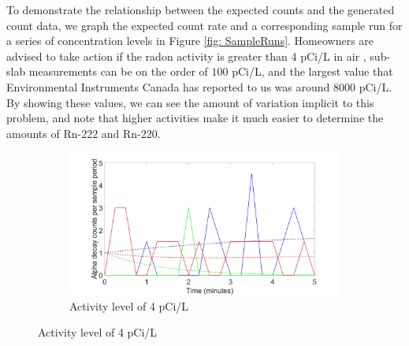 \documentclass[11pt]{m2pi}
\begin{document}
To demonstrate the relationship between the expected counts and the generated count data, we graph the expected count rate and a corresponding sample run for a series of concentration levels in Figure \ref{fig: SampleRuns}. Homeowners are advised to take action if the radon activity is greater than 4 pCi/L in air \cite{EPA}, sub-slab measurements can be on the order of $100$ pCi/L, and the largest value that Environmental Instruments Canada has reported to us was around $8000$ pCi/L. By showing these values, we can see the amount of variation implicit to this problem, and note that higher activities make it much easier to determine the amounts of Rn-222 and Rn-220.
\begin{figure}[h]
        \centering
        \begin{subfigure}[c]{\textwidth}
            \centering
            \includegraphics[scale=0.0825]{images/new_4pcpl.jpg}
            \caption[Network2]%
            {{\tiny Activity level of 4 pCi/L}}    
            \label{fig:LowActivitySample}
        \end{subfigure}
\end{figure}
\end{document}

